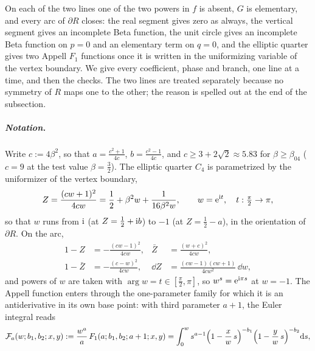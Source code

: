 On each of the two lines one of the two powers in $f$ is absent, $G$ is elementary, and every arc
of $\partial R$ closes: the real segment gives zero as always, the vertical segment gives an
incomplete Beta function, the unit circle gives an incomplete Beta function on $p = 0$ and an
elementary term on $q = 0$, and the elliptic quarter gives two Appell $F_1$ functions once it is
written in the uniformizing variable of the vertex boundary.
We give every coefficient, phase and branch, one line at a time, and then the checks.
The two lines are treated separately because no symmetry of $R$ maps one to the other; the reason
is spelled out at the end of the subsection.

\subparagraph{Notation.}
Write $c := 4 \beta^2$, so that $a = \tfrac{c^2 + 1}{4c}$, $b = \tfrac{c^2 - 1}{4c}$, and
$c \ge 3 + 2\sqrt2 \approx 5.83$ for $\beta \ge \beta_{04}$ ($c = 9$ at the test value $\beta = \tfrac32$).
The elliptic quarter $C_4$ is parametrized by the uniformizer of the vertex boundary,
\begin{equation}
  \label{jb:eq:uniformizer}
  Z
    = \frac{(c w + 1)^2}{4 c w}
    = \frac12 + \beta^2 w + \frac{1}{16 \beta^2 w},
  \qquad
  w
    = \mathrm{e}^{\mathrm{i} t},
  \quad
  t : \tfrac{\pi}{2} \to \pi,
\end{equation}
so that $w$ runs from $\mathrm{i}$ (at $Z = \tfrac12 + \mathrm{i} b$) to $-1$ (at $Z = \tfrac12 - a$), in the
orientation of $\partial R$.
On the arc,
\begin{equation}
  \label{jb:eq:uniformizer-aux}
  \begin{aligned}
    1 - Z
      &
      = - \frac{(c w - 1)^2}{4 c w},
    &
    \bar Z
      &
      = \frac{(w + c)^2}{4 c w},
    \\
    1 - \bar Z
      &
      = - \frac{(c - w)^2}{4 c w},
    &
    \dd Z
      &
      = \frac{(c w - 1)(c w + 1)}{4 c w^2} \, \dd w,
  \end{aligned}
\end{equation}
and powers of $w$ are taken with $\arg w = t \in [\tfrac{\pi}{2}, \pi]$, so $w^s = \mathrm{e}^{\mathrm{i} \pi s}$
at $w = -1$.
The Appell function enters through the one-parameter family for which it is an antiderivative in
its own base point: with third parameter $a + 1$, the Euler integral \cite{Nist:DLMF} reads
\begin{equation}
  \label{jb:eq:appell-antiderivative}
  {\mathcal{F}}_a(w; b_1, b_2; x, y)
    := \frac{w^a}{a} \, F_1(a; b_1, b_2; a + 1; x, y)
    = \int_0^w s^{a - 1}
      \Bigl( 1 - \frac{x}{w} \, s \Bigr)^{-b_1}
      \Bigl( 1 - \frac{y}{w} \, s \Bigr)^{-b_2}
      \mathrm{d} s ,
\end{equation}
